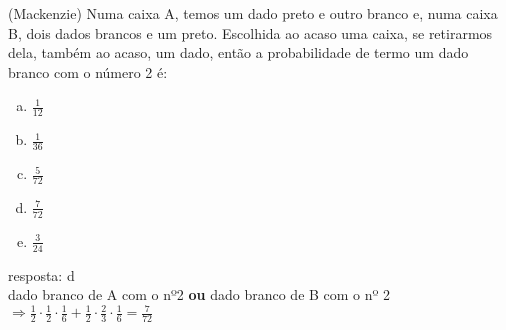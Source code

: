 \begin{ex}
(Mackenzie) Numa caixa A, temos um dado preto e outro branco e, numa caixa B, dois dados brancos e um preto. Escolhida ao acaso uma caixa, se retirarmos dela, também ao acaso, um dado, então a probabilidade de termo um dado branco com o número 2 é:
   \begin{enumerate}[(a)]
   \item $\frac{1}{12}$
   \item $\frac{1}{36}$
   \item $\frac{5}{72}$
   \item $\frac{7}{72}$
   \item $\frac{3}{24}$
   \end{enumerate}
     \begin{sol}
      resposta: d \\
       dado branco de A com o nº2 \textbf{ou}  dado branco de B com o  nº 2  $\Longrightarrow \frac{1}{2}\cdot\frac{1}{2}\cdot\frac{1}{6}+\frac{1}{2}\cdot\frac{2}{3}\cdot\frac{1}{6}=\frac{7}{72}$
      \end{sol}
\end{ex}